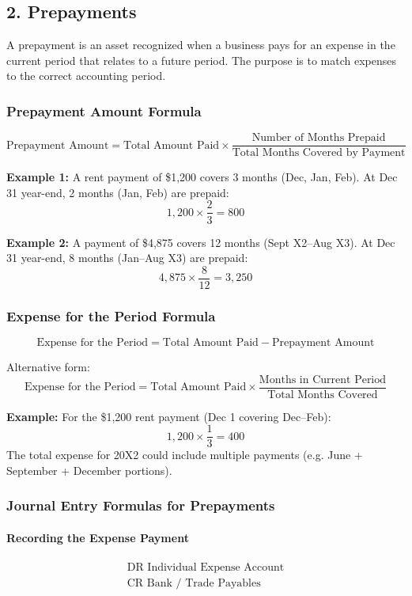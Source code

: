 \subsection*{2. Prepayments}

A prepayment is an asset recognized when a business pays for an expense in the current period that relates to a future period. The purpose is to match expenses to the correct accounting period.

\subsubsection*{Prepayment Amount Formula}

\[
\text{Prepayment Amount} = \text{Total Amount Paid} \times \frac{\text{Number of Months Prepaid}}{\text{Total Months Covered by Payment}}
\]

\textbf{Example 1:} A rent payment of \$1,200 covers 3 months (Dec, Jan, Feb). At Dec 31 year-end, 2 months (Jan, Feb) are prepaid:
\[
1,200 \times \frac{2}{3} = 800
\]

\textbf{Example 2:} A payment of \$4,875 covers 12 months (Sept X2–Aug X3). At Dec 31 year-end, 8 months (Jan–Aug X3) are prepaid:
\[
4,875 \times \frac{8}{12} = 3,250
\]

\subsubsection*{Expense for the Period Formula}

\[
\text{Expense for the Period} = \text{Total Amount Paid} - \text{Prepayment Amount}
\]

Alternative form:
\[
\text{Expense for the Period} = \text{Total Amount Paid} \times \frac{\text{Months in Current Period}}{\text{Total Months Covered}}
\]

\textbf{Example:} For the \$1,200 rent payment (Dec 1 covering Dec–Feb):  
\[
1,200 \times \frac{1}{3} = 400
\]  
The total expense for 20X2 could include multiple payments (e.g. June + September + December portions).

\subsubsection*{Journal Entry Formulas for Prepayments}

\paragraph{Recording the Expense Payment}
\[
\begin{aligned}
\text{DR Individual Expense Account} \\
\text{CR Bank / Trade Payables}
\end{aligned}
\]

